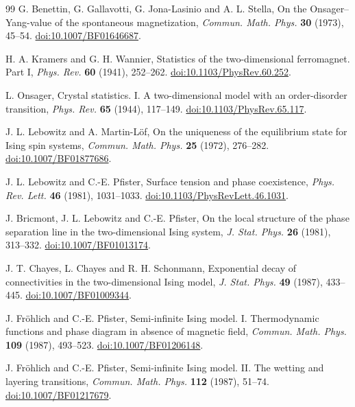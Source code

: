 \begin{thebibliography}{99}
G. Benettin, G. Gallavotti, G. Jona-Lasinio and A. L. Stella,
On the Onsager--Yang-value of the spontaneous magnetization,
\emph{Commun. Math. Phys.} \textbf{30} (1973), 45--54.
\href{https://doi.org/10.1007/BF01646687}{doi:10.1007/BF01646687}.

H. A. Kramers and G. H. Wannier,
Statistics of the two-dimensional ferromagnet. Part I,
\emph{Phys. Rev.} \textbf{60} (1941), 252--262.
\href{https://doi.org/10.1103/PhysRev.60.252}{doi:10.1103/PhysRev.60.252}.

L. Onsager,
Crystal statistics. I. A two-dimensional model with an order-disorder transition,
\emph{Phys. Rev.} \textbf{65} (1944), 117--149.
\href{https://doi.org/10.1103/PhysRev.65.117}{doi:10.1103/PhysRev.65.117}.

J. L. Lebowitz and A. Martin-L\"of,
On the uniqueness of the equilibrium state for Ising spin systems,
\emph{Commun. Math. Phys.} \textbf{25} (1972), 276--282.
\href{https://doi.org/10.1007/BF01877686}{doi:10.1007/BF01877686}.

J. L. Lebowitz and C.-E. Pfister,
Surface tension and phase coexistence,
\emph{Phys. Rev. Lett.} \textbf{46} (1981), 1031--1033.
\href{https://doi.org/10.1103/PhysRevLett.46.1031}{doi:10.1103/PhysRevLett.46.1031}.

J. Bricmont, J. L. Lebowitz and C.-E. Pfister,
On the local structure of the phase separation line in the two-dimensional Ising system,
\emph{J. Stat. Phys.} \textbf{26} (1981), 313--332.
\href{https://doi.org/10.1007/BF01013174}{doi:10.1007/BF01013174}.

J. T. Chayes, L. Chayes and R. H. Schonmann,
Exponential decay of connectivities in the two-dimensional Ising model,
\emph{J. Stat. Phys.} \textbf{49} (1987), 433--445.
\href{https://doi.org/10.1007/BF01009344}{doi:10.1007/BF01009344}.

J. Fr\"ohlich and C.-E. Pfister,
Semi-infinite Ising model. I. Thermodynamic functions and phase diagram in absence of magnetic field,
\emph{Commun. Math. Phys.} \textbf{109} (1987), 493--523.
\href{https://doi.org/10.1007/BF01206148}{doi:10.1007/BF01206148}.

J. Fr\"ohlich and C.-E. Pfister,
Semi-infinite Ising model. II. The wetting and layering transitions,
\emph{Commun. Math. Phys.} \textbf{112} (1987), 51--74.
\href{https://doi.org/10.1007/BF01217679}{doi:10.1007/BF01217679}.


\end{thebibliography}
